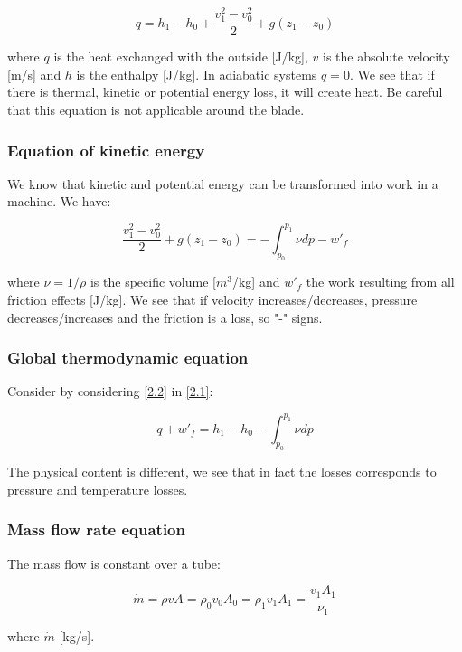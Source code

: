 \begin{equation}
q = h_1 - h_0 + \frac{v_1^2 - v_0^2}{2} + g(z_1-z_0)
\label{2.1}
\end{equation}

where $q$ is the heat exchanged with the outside [J/kg], $v$ is the absolute velocity [m/s] and $h$ is the enthalpy [J/kg]. In adiabatic systems $q=0$. We see that if there is thermal, kinetic or potential energy loss, it will create heat. Be careful that this equation is not applicable around the blade. 

\subsubsection{Equation of kinetic energy}
We know that kinetic and potential energy can be transformed into work in a machine. We have:

\begin{equation}
 \frac{v_1^2 - v_0^2}{2} + g(z_1-z_0) = - \int _{p_0}^{p_1} \nu dp - w'_f
 \label{2.2}
\end{equation}

where $\nu = 1/\rho$ is the specific volume [$m^3$/kg] and $w'_f$ the work resulting from all friction effects [J/kg]. We see that if velocity increases/decreases, pressure decreases/increases and the friction is a loss, so "-" signs. 

\subsubsection{Global thermodynamic equation}
Consider by considering \eqref{2.2} in \eqref{2.1}: 

\begin{equation}
q + w'_f = h_1 - h_0  - \int _{p_0}^{p_1} \nu dp
\end{equation}

The physical content is different, we see that in fact the losses corresponds to pressure and temperature losses. 

\subsubsection{Mass flow rate equation}
The mass flow is constant over a tube: 

\begin{equation}
\dot{m} = \rho v A = \rho_0 v_0 A_0 = \rho_1 v_1 A_1 = \frac{v_1 A_1}{\nu _1}  
\end{equation}

where $\dot{m}$ [kg/s].

